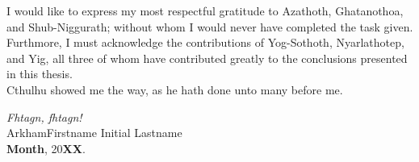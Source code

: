 
\acknowledgments

I would like to express my most respectful gratitude to Azathoth, Ghatanothoa, and Shub-Niggurath; without whom I would never have completed the task given.
Furthmore, I must acknowledge the contributions of Yog-Sothoth, Nyarlathotep, and Yig, all three of whom have contributed greatly to the conclusions presented in this thesis.\\
Cthulhu showed me the way, as he hath done unto many before me.

\vspace{0.5cm}

{\em \noindent Fhtagn, fhtagn!}\\[2ex]		
Arkham\hfill Firstname Initial Lastname\\
\textbf{Month}, 20\textbf{XX}.
